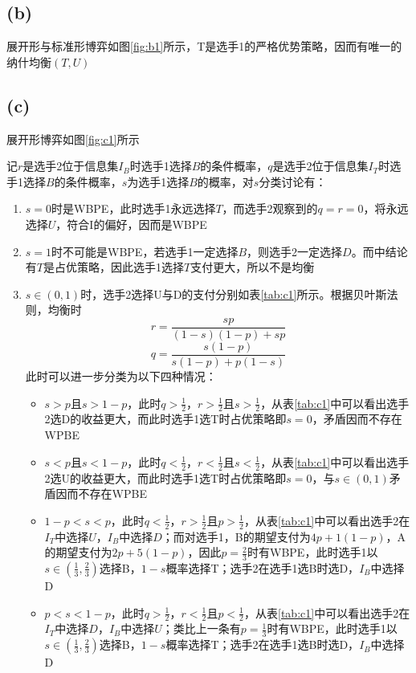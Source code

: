\documentclass[a4paper,12pt]{ctexart}
\begin{document}
\subsection*{(b)}\label{sec:b}
展开形与标准形博弈如图\ref{fig:b1}所示，T是选手1的严格优势策略，因而有唯一的纳什均衡$(T,U)$

\subsection*{(c)}\label{sec:c}
展开形博弈如图\ref{fig:c1}所示


记$r$是选手2位于信息集$I_B$时选手1选择$B$的条件概率，$q$是选手2位于信息集$I_T$时选手1选择$B$的条件概率，$s$为选手1选择$B$的概率，对$s$分类讨论有：
\begin{enumerate}
    \item $s=0$时是WBPE，此时选手1永远选择$T$，而选手2观察到的$q=r=0$，将永远选择$U$，符合I的偏好，因而是WBPE
    \item $s=1$时不可能是WBPE，若选手1一定选择$B$，则选手2一定选择$D$。而中结论有$T$是占优策略，因此选手1选择$T$支付更大，所以不是均衡
    \item $s\in(0,1)$时，选手2选择U与D的支付分别如表\ref{tab:c1}所示。根据贝叶斯法则，均衡时
    \begin{equation}
        r=\frac{sp}{(1-s)(1-p)+sp}\label{eq:c_1}
    \end{equation}
    \begin{equation}
        q=\frac{s(1-p)}{s(1-p)+p(1-s)}\label{eq:c_2}
    \end{equation}
    此时可以进一步分类为以下四种情况：
    \begin{itemize}
        \item $s>p$且$s>1-p$，此时$q>\frac{1}{2}$，$r>\frac{1}{2}$且$s>\frac{1}{2}$，从表\ref{tab:c1}中可以看出选手2选D的收益更大，而此时选手1选T时占优策略即$s=0$，矛盾因而不存在WPBE
        \item $s<p$且$s<1-p$，此时$q<\frac{1}{2}$，$r<\frac{1}{2}$且$s<\frac{1}{2}$，从表\ref{tab:c1}中可以看出选手2选U的收益更大，而此时选手1选T时占优策略即$s=0$，与$s\in(0,1)$矛盾因而不存在WPBE
        \item $1-p<s<p$，此时$q<\frac{1}{2}$，$r>\frac{1}{2}$且$p>\frac{1}{2}$，从表\ref{tab:c1}中可以看出选手2在$I_T$中选择$U$，$I_B$中选择$D$；而对选手1，B的期望支付为$4p+1(1-p)$，A的期望支付为$2p+5(1-p)$，因此$p=\frac{2}{3}$时有WBPE，此时选手1以$s\in(\frac{1}{3},\frac{2}{3})$选择B，$1-s$概率选择T；选手2在选手1选B时选D，$I_B$中选择D
        \item $p<s<1-p$，此时$q>\frac{1}{2}$，$r<\frac{1}{2}$且$p<\frac{1}{2}$，从表\ref{tab:c1}中可以看出选手2在$I_T$中选择$D$，$I_B$中选择$U$；类比上一条有$p=\frac{1}{3}$时有WBPE，此时选手1以$s\in(\frac{1}{3},\frac{2}{3})$选择B，$1-s$概率选择T；选手2在选手1选B时选D，$I_B$中选择D
    \end{itemize}
\end{enumerate}
\end{document}
